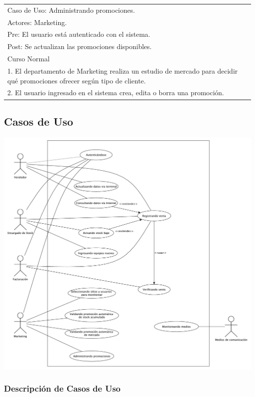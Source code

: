 \vspace{1cm}

\begin{tabular}{ | p{14cm} | }
  \hline
  Caso de Uso: Administrando promociones. \\
  Actores: Marketing. \\
  Pre: El usuario está autenticado con el sistema. \\
  Post: Se actualizan las promociones disponibles. \\
  \hline
  Curso Normal\\
  \hline
  1. El departamento de Marketing realiza un estudio de mercado para decidir qué promociones ofrecer según tipo de cliente. \\
  2. El usuario ingresado en el sistema crea, edita o borra una promoción. \\
  \hline
\end{tabular}

\subsection{Casos de Uso}

\includegraphics[width=1.1\textwidth]{./imagenes/casos_de_uso.pdf}

\clearpage

\subsubsection{Descripción de Casos de Uso}

